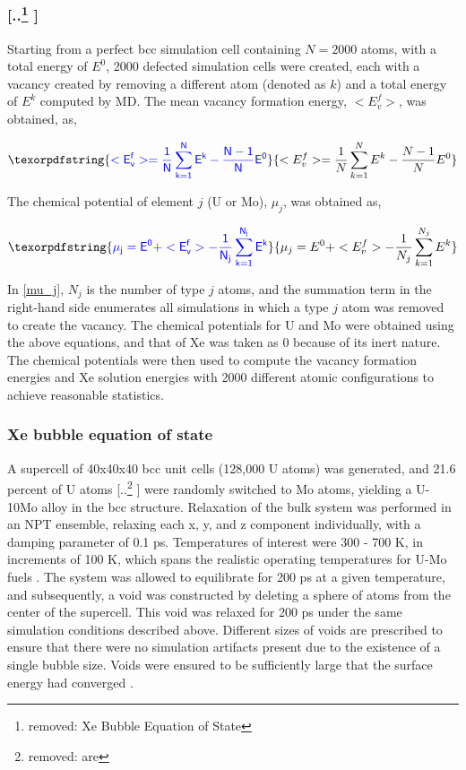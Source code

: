 \documentclass[review]{elsarticle}
\providecommand{\DIFaddtex}[1]{{\protect\color{blue} \sf #1}} %
\providecommand{\DIFdeltex}[1]{{\protect\color{red} [..\footnote{removed: #1} ]}} %
\providecommand{\DIFaddbegin}{} %
\providecommand{\DIFaddend}{} %
\providecommand{\DIFdelbegin}{} %
\providecommand{\DIFdelend}{} %
\providecommand{\DIFadd}[1]{\texorpdfstring{\DIFaddtex{#1}}{#1}} %
\providecommand{\DIFdel}[1]{\texorpdfstring{\DIFdeltex{#1}}{}} %
\newcommand{\DIFscaledelfig}{0.5}
\newlength{\DIFdelgraphicswidth} %
\newlength{\DIFdelgraphicsheight} %
\newcommand{\DIFaddincludegraphics}[2][]{{\color{blue}\fbox{\DIFOincludegraphics[#1]{#2}}}} %
\newcommand{\DIFdelincludegraphics}[2][]{%
\sbox{\DIFdelgraphicsbox}{\DIFOincludegraphics[#1]{#2}}%
\settoboxwidth{\DIFdelgraphicswidth}{\DIFdelgraphicsbox} %
\settoboxtotalheight{\DIFdelgraphicsheight}{\DIFdelgraphicsbox} %
\scalebox{\DIFscaledelfig}{%
\parbox[b]{\DIFdelgraphicswidth}{\usebox{\DIFdelgraphicsbox}\\[-\baselineskip] \rule{\DIFdelgraphicswidth}{0em}}\llap{\resizebox{\DIFdelgraphicswidth}{\DIFdelgraphicsheight}{%
\setlength{\unitlength}{\DIFdelgraphicswidth}%
\begin{picture}(1,1)%
\thicklines\linethickness{2pt} %
{\color[rgb]{1,0,0}\put(0,0){\framebox(1,1){}}}%
{\color[rgb]{1,0,0}\put(0,0){\line( 1,1){1}}}%
{\color[rgb]{1,0,0}\put(0,1){\line(1,-1){1}}}%
\end{picture}%
}\hspace*{3pt}}} %
} %
\DeclareRobustCommand{\DIFaddbegin}{\DIFOaddbegin \let\includegraphics\DIFaddincludegraphics} %
\DeclareRobustCommand{\DIFaddend}{\DIFOaddend \let\includegraphics\DIFOincludegraphics} %
\DeclareRobustCommand{\DIFdelbegin}{\DIFOdelbegin \let\includegraphics\DIFdelincludegraphics} %
\DeclareRobustCommand{\DIFdelend}{\DIFOaddend \let\includegraphics\DIFOincludegraphics} %
\begin{document}
\DIFdelbegin \subsubsection{\DIFdel{Xe Bubble Equation of State}}
\addtocounter{subsubsection}{-1}%
\DIFdelend \DIFaddbegin \DIFadd{Starting from a perfect bcc simulation cell containing $N=2000$ atoms, with a total energy of $E^0$, 2000 defected simulation cells were created, each with a vacancy created by removing a different atom (denoted as $k$) and a total energy of $E^k$ computed by MD. The mean vacancy formation energy, $<E^f_v>$, was obtained, as,
}\DIFaddend 

\DIFaddbegin \begin{equation}\DIFadd{\label{mean_Efv}
<E^f_v> = \frac{1}{N}\sum_{k=1}^{N} E^k -\frac{N-1}{N}E^0   
}\end{equation}

\DIFadd{The chemical potential of element $j$ (U or Mo), $\mu_j$, was obtained as, 
}

\begin{equation}\DIFadd{\label{mu_j}
\mu_j=E^0+<E^f_v> - \frac{1}{N_j}\sum_{k=1}^{N_j} E^k   
}\end{equation}

\DIFadd{In \cref{mu_j}, $N_j$ is the number of type $j$ atoms, and the summation term in the right-hand side enumerates all simulations in which a type $j$ atom was removed to create the vacancy. The chemical potentials for U and Mo were obtained using the above equations, and that of Xe was taken as 0 because of its inert nature. The chemical potentials were then used to compute the vacancy formation energies and Xe solution energies with 2000 different atomic configurations to achieve reasonable statistics. 
}

\subsubsection{\DIFadd{Xe bubble equation of state}}

\DIFaddend A supercell of 40x40x40 bcc unit cells (128,000 U atoms) was generated, and 21.6 percent of U atoms \DIFdelbegin \DIFdel{are }\DIFdelend \DIFaddbegin \DIFadd{were }\DIFaddend randomly switched to Mo atoms, yielding a U-10Mo alloy in the bcc structure. Relaxation of the bulk system was performed in an NPT ensemble, relaxing each x, y, and z component individually, with a damping parameter of 0.1 ps. Temperatures of interest were 300 - 700 K, in increments of 100 K, which spans the realistic operating temperatures for U-Mo fuels \cite{umo_prelim_report2017}. The system was allowed to equilibrate for 200 ps at a given temperature, and subsequently, a void was constructed by deleting a sphere of atoms from the center of the supercell. This void was relaxed for 200 ps under the same simulation conditions described above. Different sizes of voids are prescribed to ensure that there were no simulation artifacts present due to the existence of a single bubble size. Voids were ensured to be sufficiently large that the surface energy had converged \cite{Beeler2020}. 
\end{document}
